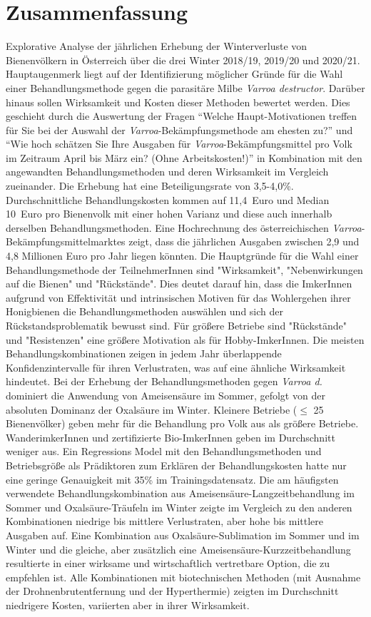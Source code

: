 \chapter*{Zusammenfassung}
\label{sec:Zusammenfassung}
\vspace*{-15mm}

Explorative Analyse der jährlichen Erhebung der Winterverluste von Bienenvölkern in Österreich über die drei Winter 2018/19, 2019/20 und 2020/21. Hauptaugenmerk liegt auf der Identifizierung möglicher Gründe für die Wahl einer Behandlungsmethode gegen die parasitäre Milbe \textit{Varroa destructor}. Darüber hinaus sollen Wirksamkeit und Kosten dieser Methoden bewertet werden. Dies geschieht durch die Auswertung der Fragen \enquote{Welche Haupt-Motivationen treffen für Sie bei der Auswahl der \textit{Varroa}-Bekämpfungsmethode am ehesten zu?} und \enquote{Wie hoch schätzen Sie Ihre Ausgaben für \textit{Varroa}-Bekämpfungsmittel pro Volk im Zeitraum April bis März ein? (Ohne Arbeitskosten!)} in Kombination mit den angewandten Behandlungsmethoden und deren Wirksamkeit im Vergleich zueinander. Die Erhebung hat eine Beteiligungsrate von 3,5-4,0\%. Durchschnittliche Behandlungskosten kommen auf 11,4~Euro und Median 10~Euro pro Bienenvolk mit einer hohen Varianz und diese auch innerhalb derselben Behandlungsmethoden. Eine Hochrechnung des österreichischen \textit{Varroa}-Bekämpfungsmittelmarktes zeigt, dass die jährlichen Ausgaben zwischen 2,9 und 4,8 Millionen Euro pro Jahr liegen könnten. Die Hauptgründe für die Wahl einer Behandlungsmethode der TeilnehmerInnen sind "Wirksamkeit", "Nebenwirkungen auf die Bienen" und "Rückstände". Dies deutet darauf hin, dass die ImkerInnen aufgrund von Effektivität und intrinsischen Motiven für das Wohlergehen ihrer Honigbienen die Behandlungsmethoden auswählen und sich der Rückstandsproblematik bewusst sind. Für größere Betriebe sind "Rückstände" und "Resistenzen" eine größere Motivation als für Hobby-ImkerInnen. Die meisten Behandlungskombinationen zeigen in jedem Jahr überlappende Konfidenzintervalle für ihren Verlustraten, was auf eine ähnliche Wirksamkeit hindeutet. Bei der Erhebung der Behandlungsmethoden gegen \textit{Varroa d.} dominiert die Anwendung von Ameisensäure im Sommer, gefolgt von der absoluten Dominanz der Oxalsäure im Winter. Kleinere Betriebe ($\leq$ 25 Bienenvölker) geben mehr für die Behandlung pro Volk aus als größere Betriebe. WanderimkerInnen und zertifizierte Bio-ImkerInnen geben im Durchschnitt weniger aus. Ein Regressions Model mit den Behandlungsmethoden und Betriebsgröße als Prädiktoren zum Erklären der Behandlungskosten hatte nur eine geringe Genauigkeit mit 35\% im Trainingsdatensatz. Die am häufigsten verwendete Behandlungskombination aus Ameisensäure-Langzeitbehandlung im Sommer und Oxalsäure-Träufeln im Winter zeigte im Vergleich zu den anderen Kombinationen niedrige bis mittlere Verlustraten, aber hohe bis mittlere Ausgaben auf. Eine Kombination aus Oxalsäure-Sublimation im Sommer und im Winter und die gleiche, aber zusätzlich eine Ameisensäure-Kurzzeitbehandlung resultierte in einer wirksame und wirtschaftlich vertretbare Option, die zu empfehlen ist. Alle Kombinationen mit biotechnischen Methoden (mit Ausnahme der Drohnenbrutentfernung und der Hyperthermie) zeigten im Durchschnitt niedrigere Kosten, variierten aber in ihrer Wirksamkeit.
